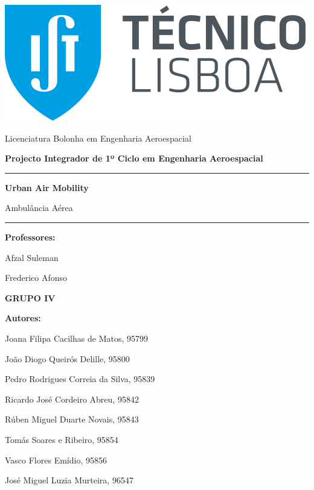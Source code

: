 \begin{titlepage}

   \begin{center}
        \includegraphics[scale=0.4]{Imagens/IST.png} 
        
        \vspace*{1cm}
        {\LARGE Licenciatura Bolonha em Engenharia Aeroespacial}
        
        \vspace{1cm} 
        \textbf{\Large Projecto Integrador de 1º Ciclo em Engenharia Aeroespacial}
        
        \vspace{1.5 cm}
        \noindent\rule{13cm}{0.4pt}
        
        \vspace{0.5cm}
        \textbf{\Huge Urban Air Mobility}

        \vspace{0.3cm}
       {\LARGE Ambulância Aérea}
       
        \noindent\rule{13cm}{0.4pt}
        
        \vspace{1.5cm}
        
        \Large {\textbf{Professores:}} 
       \par Afzal Suleman
       \par Frederico Afonso
        
        \vspace{1.5cm}
        \Large\textbf{GRUPO IV}
       \vspace{0.5cm}

       \Large {\textbf{Autores:} 
       \par Joana Filipa Cacilhas de Matos, 95799
       \par João Diogo Queirós Delille, 95800
       \par Pedro Rodrigues Correia da Silva, 95839
       \par Ricardo José Cordeiro Abreu, 95842
       \par Rúben Miguel Duarte Novais, 95843
       \par Tomás Soares e Ribeiro, 95854
       \par Vasco Flores Emídio, 95856
       \par José Miguel Luzia Murteira, 96547}

            
   \end{center}
\end{titlepage}

\clearpage